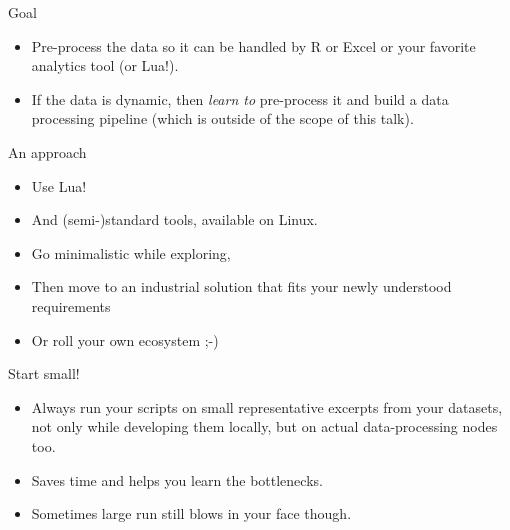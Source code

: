 \documentclass[handout]{beamer}
\begin{document}

\begin{frame}{Goal}

\begin{itemize}
\item Pre-process the data so it can be handled by R or Excel or your favorite
analytics tool (or Lua!).
\item If the data is dynamic, then \textit{learn to} pre-process it
      and build a data processing pipeline
      (which is outside of the scope of this talk).
\end{itemize}

\end{frame}


\begin{frame}{An approach}

\begin{itemize}
\item Use Lua!
\item And (semi-)standard tools, available on Linux.
\item Go minimalistic while exploring,
\item Then move to an industrial solution that fits your newly understood
      requirements
\item Or roll your own ecosystem ;-)
\end{itemize}

\end{frame}


\begin{frame}{Start small!}

\begin{itemize}
\item Always run your scripts on small representative excerpts
      from your datasets, not only while developing them locally,
      but on actual data-processing nodes too.
\item Saves time and helps you learn the bottlenecks.
\item Sometimes large run still blows in your face though.
\end{itemize}

\end{frame}
\end{document}
